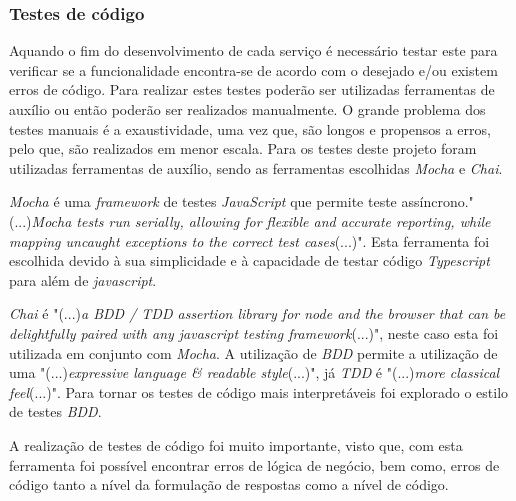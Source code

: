 \subsubsection{Testes de código}
Aquando o fim do desenvolvimento de cada serviço é necessário testar este para verificar se a funcionalidade encontra-se de acordo com o desejado e/ou existem erros de código. Para realizar estes testes poderão ser utilizadas ferramentas de auxílio ou então poderão ser realizados manualmente. O grande problema dos testes manuais é a exaustividade, uma vez que, são longos e propensos a erros, pelo que, são realizados em menor escala. Para os testes deste projeto foram utilizadas ferramentas de auxílio, sendo as ferramentas escolhidas \textit{Mocha} e \textit{Chai}.

\textit{Mocha} é uma \textit{framework} de testes \textit{JavaScript} que permite teste assíncrono."(...)\emph{Mocha tests run serially, allowing for flexible and accurate reporting, while mapping uncaught exceptions to the correct test cases}(...)"\citep{mocha}. Esta ferramenta foi escolhida devido à sua simplicidade e à capacidade de testar código \textit{Typescript} para além de \textit{javascript}.

\textit{Chai} é "(...)\emph{a BDD / TDD assertion library for node and the browser that can be delightfully paired with any javascript testing framework}(...)"\citep{chai}, neste caso esta foi utilizada em conjunto com \emph{Mocha}. A utilização de \emph{BDD} permite a utilização de uma "(...)\emph{expressive language \& readable style}(...)"\citep{chai}, já \emph{TDD} é "(...)\emph{more classical feel}(...)"\citep{chai}. Para tornar os testes de código mais interpretáveis foi explorado o estilo de testes \emph{BDD}.

A realização de testes de código foi muito importante, visto que, com esta ferramenta foi possível encontrar erros de lógica de negócio, bem como, erros de código tanto a nível da formulação de respostas como a nível de código.



